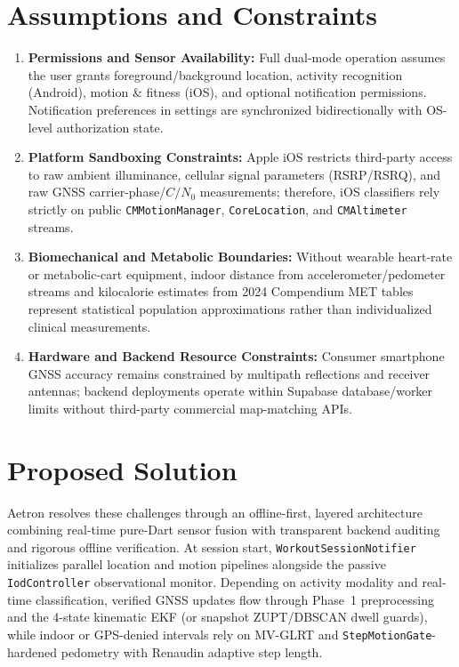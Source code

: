 \section{Assumptions and Constraints}
\begin{enumerate}
    \item \textbf{Permissions and Sensor Availability:} Full dual-mode operation assumes the user grants foreground/background location, activity recognition (Android), motion \& fitness (iOS), and optional notification permissions. Notification preferences in settings are synchronized bidirectionally with OS-level authorization state.
    \item \textbf{Platform Sandboxing Constraints:} Apple iOS restricts third-party access to raw ambient illuminance, cellular signal parameters (RSRP/RSRQ), and raw GNSS carrier-phase/$C/N_0$ measurements; therefore, iOS classifiers rely strictly on public \texttt{CMMotionManager}, \texttt{CoreLocation}, and \texttt{CMAltimeter} streams.
    \item \textbf{Biomechanical and Metabolic Boundaries:} Without wearable heart-rate or metabolic-cart equipment, indoor distance from accelerometer/pedometer streams and kilocalorie estimates from 2024 Compendium MET tables represent statistical population approximations rather than individualized clinical measurements.
    \item \textbf{Hardware and Backend Resource Constraints:} Consumer smartphone GNSS accuracy remains constrained by multipath reflections and receiver antennas; backend deployments operate within Supabase database/worker limits without third-party commercial map-matching APIs.
\end{enumerate}

\section{Proposed Solution}
Aetron resolves these challenges through an offline-first, layered architecture combining real-time pure-Dart sensor fusion with transparent backend auditing and rigorous offline verification. At session start, \texttt{WorkoutSessionNotifier} initializes parallel location and motion pipelines alongside the passive \texttt{IodController} observational monitor. Depending on activity modality and real-time classification, verified GNSS updates flow through Phase~1 preprocessing and the 4-state kinematic EKF (or snapshot ZUPT/DBSCAN dwell guards), while indoor or GPS-denied intervals rely on MV-GLRT and \texttt{StepMotionGate}-hardened pedometry with Renaudin adaptive step length.

